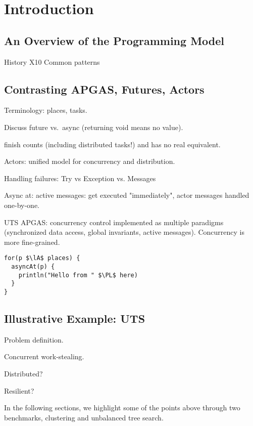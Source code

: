 \section{Introduction}

\subsection{An Overview of the \apgas Programming Model}

History
X10
Common patterns

\subsection{Contrasting APGAS, Futures, Actors}

Terminology: places, tasks.

Discuss future vs.\ async (returning void means no value).

finish counts (including distributed tasks!) and has no real equivalent.

Actors: unified model for concurrency and distribution.

Handling failures: Try vs Exception vs. Messages

Async at: active messages: get executed "immediately", actor messages handled one-by-one.

UTS APGAS: concurrency control implemented as multiple paradigms (synchronized
data access, global invariants, active messages). Concurrency is more
fine-grained.

\begin{lstlisting}
for(p $\lA$ places) {
  asyncAt(p) {
    println("Hello from " $\PL$ here)
  }
}
\end{lstlisting}

\subsection{Illustrative Example: UTS}

Problem definition.

Concurrent work-stealing.

Distributed?

Resilient?

In the following sections, we highlight some of the points above through two
benchmarks, \kmeans clustering and unbalanced tree search.
